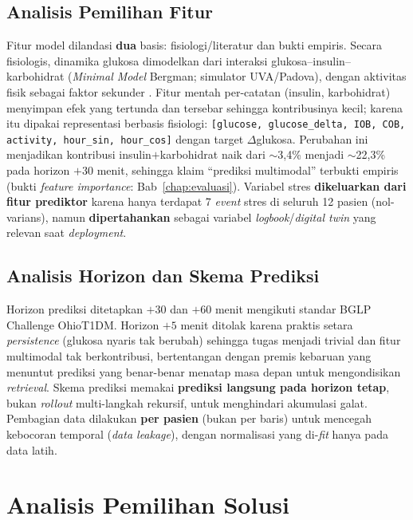 \subsection{Analisis Pemilihan Fitur}
Fitur model dilandasi \textbf{dua} basis: fisiologi/literatur dan bukti empiris. Secara fisiologis, dinamika glukosa dimodelkan dari interaksi glukosa--insulin--karbohidrat (\emph{Minimal Model} Bergman; simulator UVA/Padova), dengan aktivitas fisik sebagai faktor sekunder \autocite{bergman1979,dallaman2014}. Fitur mentah per-catatan (insulin, karbohidrat) menyimpan efek yang tertunda dan tersebar sehingga kontribusinya kecil; karena itu dipakai representasi berbasis fisiologi: \texttt{[glucose, glucose\_delta, IOB, COB, activity, hour\_sin, hour\_cos]} dengan target $\Delta$glukosa. Perubahan ini menjadikan kontribusi insulin$+$karbohidrat naik dari $\sim$3,4\% menjadi $\sim$22,3\% pada horizon $+30$ menit, sehingga klaim ``prediksi multimodal'' terbukti empiris (bukti \emph{feature importance}: Bab~\ref{chap:evaluasi}). Variabel stres \textbf{dikeluarkan dari fitur prediktor} karena hanya terdapat 7 \emph{event} stres di seluruh 12 pasien (nol-varians), namun \textbf{dipertahankan} sebagai variabel \emph{logbook}/\emph{digital twin} yang relevan saat \emph{deployment}.

\subsection{Analisis Horizon dan Skema Prediksi}
Horizon prediksi ditetapkan $+30$ dan $+60$ menit mengikuti standar BGLP Challenge OhioT1DM. Horizon $+5$ menit ditolak karena praktis setara \emph{persistence} (glukosa nyaris tak berubah) sehingga tugas menjadi trivial dan fitur multimodal tak berkontribusi, bertentangan dengan premis kebaruan yang menuntut prediksi yang benar-benar menatap masa depan untuk mengondisikan \emph{retrieval}. Skema prediksi memakai \textbf{prediksi langsung pada horizon tetap}, bukan \emph{rollout} multi-langkah rekursif, untuk menghindari akumulasi galat. Pembagian data dilakukan \textbf{per pasien} (bukan per baris) untuk mencegah kebocoran temporal (\emph{data leakage}), dengan normalisasi yang di-\emph{fit} hanya pada data latih.

\section{Analisis Pemilihan Solusi}

